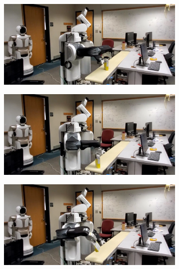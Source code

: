 \documentclass[a4paper]{report}
\begin{document}
\begin{figure}[t]
\begin{subfigure}{0.48\textwidth}
        \caption{}
        \label{fig:demo3}
    \end{subfigure}
    \hspace{2mm}
    \begin{subfigure}{0.48\textwidth}
         \includegraphics[trim=0 0 400 0, clip, width=\textwidth]{4}
        \caption{}
        \label{fig:demo4}
    \end{subfigure}
    \begin{subfigure}{0.48\textwidth}
         \includegraphics[trim=0 0 400 0, clip, width=\textwidth]{5}
        \caption{}
        \label{fig:demo5}
    \end{subfigure}
    \hspace{2mm}
    \begin{subfigure}{0.48\textwidth}
         \includegraphics[trim=0 0 400 0, clip, width=\textwidth]{6}

\end{subfigure}
\end{figure}
\end{document}
